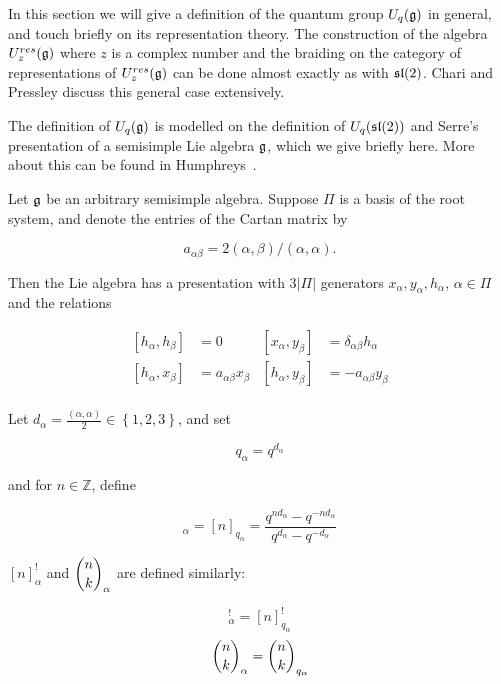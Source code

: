 In this section we will give a definition of the quantum group $U_q(\mathfrak{g})$ in
general, and touch briefly on its representation theory. The construction of
the algebra $U_z^{res}(\mathfrak{g})$ where $z$ is a complex number and the braiding
on the category of representations of $U_z^{res}(\mathfrak{g})$ can be done almost
exactly as with $\mathfrak{sl}(2)$. Chari and Pressley \cite{CP} discuss this general
case extensively. 

The definition of $U_q(\mathfrak{g})$ is modelled on the definition of $U_q(\mathfrak{sl}(2))$
and Serre's presentation of a semisimple Lie algebra $\mathfrak{g}$, which we give
briefly here. More about this can be found in Humphreys~\cite{Humphreys1973}.

Let $\mathfrak{g}$ be an arbitrary semisimple algebra. Suppose $\Pi$ is
a basis of the root system, and denote the entries of the Cartan matrix
by 

    \begin{equation}
        a_{\alpha\beta} = 2(\alpha, \beta) / (\alpha, \alpha).
    \end{equation}

    Then the Lie algebra has a presentation with $3|\Pi|$ generators
    $x_\alpha, y_\alpha, h_\alpha$, $\alpha \in \Pi$ and the relations 

    \begin{align}
        \left[ h_\alpha, h_\beta \right] &= 0       &   \left[ x_\alpha, y_\beta \right] &= \delta_{\alpha\beta} h_\alpha \\
        \left[ h_\alpha, x_\beta \right] &= a_{\alpha\beta} x_\beta  &   \left[ h_\alpha, y_\beta \right] &= -a_{\alpha\beta} y_\beta \\
    \end{align}

    Let $d_\alpha = \frac{(\alpha,\alpha)}{2} \in \left\{ 1,2,3 \right\}$, and set 

    \begin{equation}
        q_\alpha = q^{d_\alpha}
    \end{equation}

    and for $n \in \mathbb{Z}$, define

    \begin{equation}
        [n]_\alpha = [n]_{q_\alpha} = \frac{q^{nd_\alpha} - q^{-nd_\alpha}}{q^{d_\alpha} - q^{-d_\alpha}}
    \end{equation}

    $[n]_\alpha^!$ and $\dbinom{n}{k}_\alpha$ are defined similarly: 
    
    \begin{equation}
        [n]_\alpha^! = [n]_{q_{\alpha}}^!
    \end{equation}
    \begin{equation}
        \dbinom{n}{k}_\alpha = \dbinom{n}{k}_{q_\alpha}
    \end{equation}

